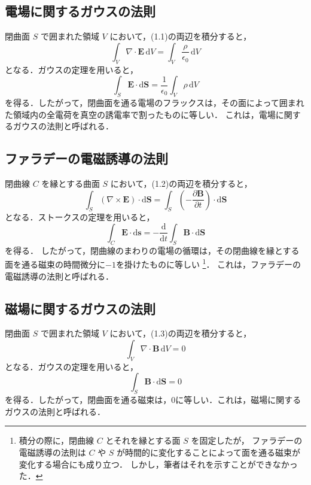\documentclass[11pt, a4paper]{ltjsarticle}
\numberwithin{equation}{section}
\begin{document}
\subsection{電場に関するガウスの法則}
閉曲面 $S$ で囲まれた領域 $V$ において，(1.1)の両辺を積分すると，
\[
  \int_V \nabla \cdot \bm{E} \, \mathrm{d}V = \int_V \frac{\rho}{\epsilon_0} \, \mathrm{d}V
\]
となる．ガウスの定理を用いると，
\begin{equation}
  \int_{S} \bm{E} \cdot \mathrm{d}\bm{S} = \frac{1}{\epsilon_0} \int_{V} \rho \, \mathrm{d}V
\end{equation}
を得る．したがって，閉曲面を通る電場のフラックスは，その面によって囲まれた領域内の全電荷を真空の誘電率で割ったものに等しい．
これは，電場に関するガウスの法則と呼ばれる．

\subsection{ファラデーの電磁誘導の法則}
閉曲線 $C$ を縁とする曲面 $S$ において，(1.2)の両辺を積分すると，
\[
  \int_S \left( \nabla \times \bm{E} \right) \cdot \mathrm{d}\bm{S} = \int_S \left( -\frac{\partial \bm{B}}{\partial t} \right) \cdot \mathrm{d}\bm{S}
\]
となる．ストークスの定理を用いると，
\begin{equation}
  \int_C \bm{E} \cdot \mathrm{d}\bm{s} = - \frac{\mathrm{d}}{\mathrm{d}t} \int_S \bm{B} \cdot \mathrm{d}\bm{S}
\end{equation}
を得る．
したがって，閉曲線のまわりの電場の循環は，その閉曲線を縁とする面を通る磁束の時間微分に$-1$を掛けたものに等しい
\footnote{積分の際に，閉曲線 $C$ とそれを縁とする面 $S$ を固定したが，
ファラデーの電磁誘導の法則は $C$ や $S$ が時間的に変化することによって面を通る磁束が変化する場合にも成り立つ．
しかし，筆者はそれを示すことができなかった．}．
これは，ファラデーの電磁誘導の法則と呼ばれる．

\subsection{磁場に関するガウスの法則}
閉曲面 $S$ で囲まれた領域 $V$ において，(1.3)の両辺を積分すると，
\[
  \int_V \nabla \cdot \bm{B} \, \mathrm{d}V = 0
\]
となる．ガウスの定理を用いると，
\begin{equation}
  \int_{S} \bm{B} \cdot \mathrm{d}\bm{S} = 0
\end{equation}
を得る．したがって，閉曲面を通る磁束は，$0$に等しい．これは，磁場に関するガウスの法則と呼ばれる．
\end{document}
